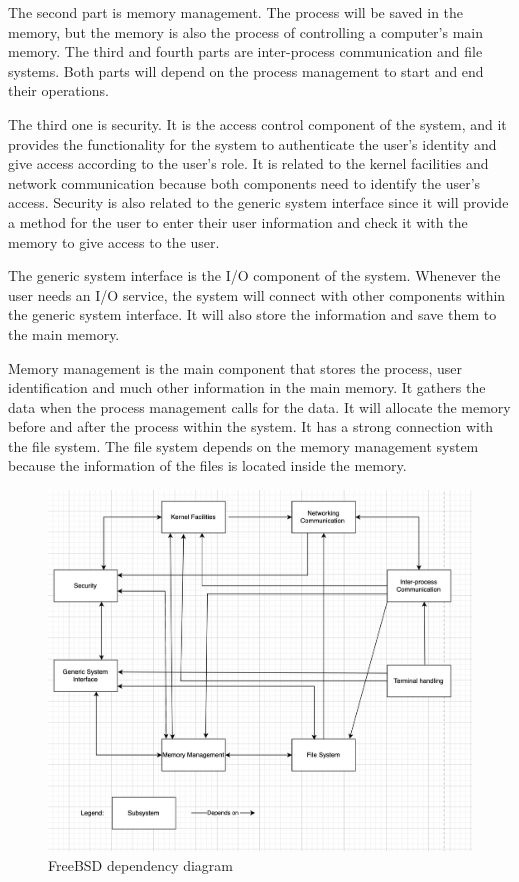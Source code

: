 \documentclass[12pt, dvipsnames, a4paper]{article}
\begin{document}
The second part is memory management. The process will be saved in the memory, but the memory is also the process of controlling a
computer's main memory. The third and fourth parts are inter-process communication and file systems. Both parts will depend on the process management to start and end their
operations.

The third one is security. It is the access control component of the system, and it provides the functionality for the system to authenticate the user's identity and give access according to the user's role. It is related to the kernel facilities and network communication because both components need to identify the user's access. Security is also related to the generic system interface since it will provide a method for the user to enter their user information and check it with the memory to give access to the user.

The generic system interface is the I/O component of the system. Whenever the user needs an I/O service, the system will connect with other components within the generic system interface. It will also store the information and save them to the main memory.

Memory management is the main component that stores the process, user identification and much other information in the main memory. It gathers the data when the process management calls for the data. It will allocate the memory before and after the process within the system. It has a strong connection with the file system. The file system depends on the memory management system because the information of the files is located inside the memory.
\begin{figure}[!htb]
	\centering
	\includegraphics[width = 390pt]{assets/other_diagrams/dependency-structure.png}
	\caption{FreeBSD dependency diagram}
\end{figure}
\end{document}
